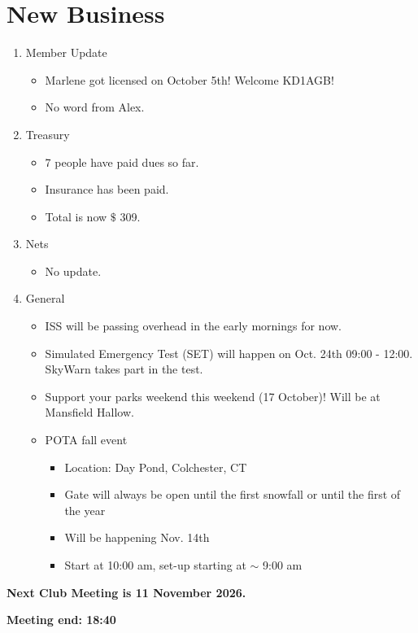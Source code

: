 \documentclass[12pt, letterpaper]{article}
\begin{document}
\section{New Business}
    \begin{enumerate}
    \item Member Update
        \begin{itemize}
            \item  Marlene got licensed on October 5th! Welcome KD1AGB!
            \item No word from Alex.
        \end{itemize}
    \item Treasury
        \begin{itemize}
            \item 7 people have paid dues so far.
            \item Insurance has been paid.
            \item Total is now $\mathdollar$ 309.
        \end{itemize}
    \item Nets
        \begin{itemize}
            \item No update.
        \end{itemize}
    \item General
        \begin{itemize}
            \item ISS will be passing overhead in the early mornings for now.
            \item Simulated Emergency Test (SET) will happen on Oct. 24th 09:00 - 12:00. SkyWarn takes part in the test.
            \item Support your parks weekend this weekend (17 October)! Will be at Mansfield Hallow.
            \item POTA fall event
                \begin{itemize}
                    \item Location: Day Pond, Colchester, CT
                    \item Gate will always be open until the first snowfall or until the first of the year
                    \item Will be happening Nov. 14th
                    \item Start at 10:00 am, set-up starting at $\sim$ 9:00 am
                \end{itemize}
        \end{itemize}
    \end{enumerate}

    \textbf{\Large{Next Club Meeting is 11 November 2026.}}

    \textbf{Meeting end: 18:40}
\end{document}
